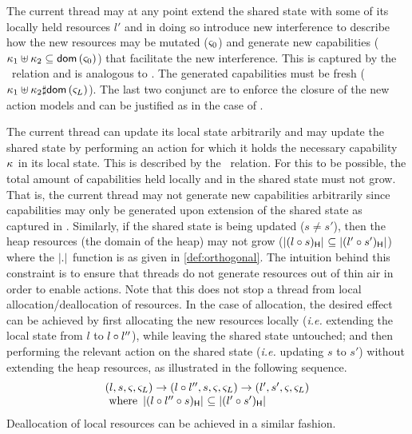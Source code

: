 %
%
The current thread may at any point extend the shared state with some of its locally held resources $l'$ and in doing so introduce new interference to describe how the new resources may be mutated ($\varsigma_{0}$) and generate  new capabilities ($\kappa_{1} \uplus \kappa_{2} \subseteq \textsf{dom}\left( \varsigma_{0} \right)$) that facilitate the new interference. This is captured by the \extendG\ relation and is analogous to \extendR.  The generated capabilities must be fresh ($\kappa_{1} \uplus \kappa_{2}  \sharp \textsf{dom}\left( \varsigma_{L} \right)$). The last two conjunct are to enforce the closure of the new action models and can be justified as in the case of \extendR.

The current thread can update its local state arbitrarily and may update the shared state by performing an action for which it holds the necessary capability $\kappa_{}$ in its local state. This is described by the \updateG\ relation. For this to be possible, the total amount of capabilities held locally and in the shared state must not grow. That is, the current thread may not generate new capabilities arbitrarily since capabilities may only be generated upon extension of the shared state as captured in \extendG. Similarly, if the shared state is being updated ($s \not= s'$),  then the heap resources (the domain of the heap) may not grow ($\left\lvert (l \circ s)_{\textsf{H}}\right\rvert_{} \subseteq \left\lvert (l' \circ s')_{\textsf{H}}\right\rvert_{}$) where the $\left\lvert .\right\rvert_{}$ function is as given in \ref{def:orthogonal}. The intuition behind this constraint is to ensure that threads do not generate resources out of thin air in order to enable actions. Note that this does not stop a thread from local allocation/deallocation of resources. In the case of allocation, the desired effect can be achieved by first allocating the new resources locally (\textit{i.e.} extending the local state from $l$ to $l \circ l''$), while leaving the shared state untouched; and then performing the relevant action on the shared state (\textit{i.e.} updating $s$ to $s'$) without extending the heap resources, as illustrated in the following sequence.
%
\[
\begin{array}{l}
	(l, s, \varsigma_{}, \varsigma_{L}) \rightarrow (l \circ l'', s, \varsigma_{}, \varsigma_{L}) \rightarrow (l', s', \varsigma_{}, \varsigma_{L})\\
	\text{ where } \left\lvert (l \circ l'' \circ s)_{\textsf{H}}\right\rvert_{} \subseteq \left\lvert (l' \circ s')_{\textsf{H}}\right\rvert_{}
\end{array}
\]
%
Deallocation of local resources can be achieved in a similar fashion.


